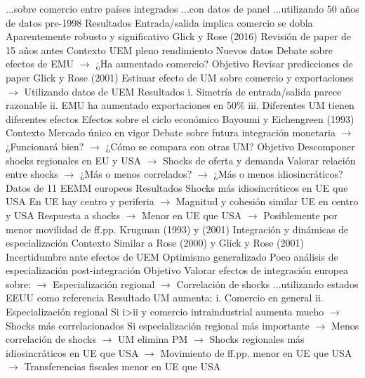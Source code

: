 \documentclass{nuevotema}
\begin{document}
\begin{esquemal}
				\4[] ...sobre comercio entre países integrados
				\4[] ...con datos de panel
				\4[] ...utilizando 50 años de datos pre-1998
				\4 Resultados
				\4[] Entrada/salida implica comercio se dobla
				\4[] Aparentemente robusto y significativo
			\3 Glick y Rose (2016)
				\4 Revisión de paper de 15 años antes
				\4 Contexto
				\4[] UEM pleno rendimiento
				\4[] Nuevos datos
				\4[] Debate sobre efectos de EMU
				\4[] $\to$ ¿Ha aumentado comercio?
				\4 Objetivo
				\4[] Revisar predicciones de paper Glick y Rose (2001)
				\4[] Estimar efecto de UM sobre comercio y exportaciones
				\4[] $\to$ Utilizando datos de UEM
				\4 Resultados
				\4[] i. Simetría de entrada/salida parece razonable
				\4[] ii. EMU ha aumentado exportaciones en 50\%
				\4[] iii. Diferentes UM tienen diferentes efectos
		\2 Efectos sobre el ciclo económico
			\3 Bayoumi y Eichengreen (1993)
				\4 Contexto
				\4[] Mercado único en vigor
				\4[] Debate sobre futura integración monetaria
				\4[] $\to$ ¿Funcionará bien?
				\4[] $\to$ ¿Cómo se compara con otras UM?
				\4 Objetivo
				\4[] Descomponer shocks regionales en EU y USA
				\4[] $\to$ Shocks de oferta y demanda
				\4[] Valorar relación entre shocks
				\4[] $\to$ ¿Más o menos correlados?
				\4[] $\to$ ¿Más o menos idiosincráticos?
				\4[] Datos de 11 EEMM europeos
				\4 Resultados
				\4[] Shocks más idiosincráticos en UE que USA
				\4[] En UE hay centro y periferia
				\4[] $\to$ Magnitud y cohesión similar UE en centro y USA
				\4[] Respuesta a shocks
				\4[] $\to$ Menor en UE que USA
				\4[] $\to$ Posiblemente por menor movilidad de ff.pp.
			\3 Krugman (1993) y (2001)
				\4 Integración y dinámicas de especialización
				\4 Contexto
				\4[] Similar a Rose (2000) y Glick y Rose (2001)
				\4[] Incertidumbre ante efectos de UEM
				\4[] Optimismo generalizado
				\4[] Poco análisis de especialización post-integración
				\4 Objetivo
				\4[] Valorar efectos de integración europea sobre:
				\4[] $\to$ Especialización regional
				\4[] $\to$ Correlación de shocks
				\4[] ...utilizando estados EEUU como referencia
				\4 Resultado
				\4[] UM aumenta:
				\4[] i. Comercio en general
				\4[] ii. Especialización regional
				\4[] Si i>ii y comercio intraindustrial aumenta mucho
				\4[] $\to$ Shocks más correlacionados
				\4[] Si especialización regional más importante
				\4[] $\to$ Menos correlación de shocks
				\4[] $\to$ UM elimina PM
				\4[] $\to$ Shocks regionales más idiosincráticos en UE que USA
				\4[] $\to$ Movimiento de ff.pp. menor en UE que USA
				\4[] $\to$ Transferencias fiscales menor en UE que USA

\end{esquemal}
\end{document}
